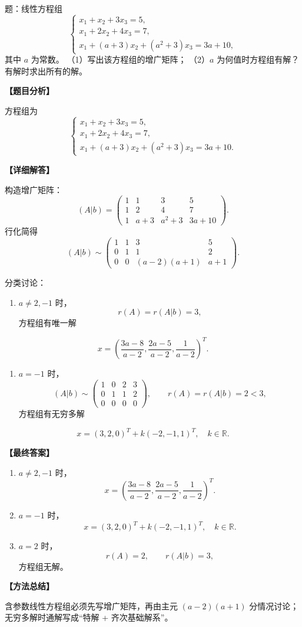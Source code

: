 ﻿\documentclass[11pt,a4paper,UTF8]{ctexart}
\begin{document}
\begin{answerbox}
题：线性方程组
\[
\begin{cases}
x_1+x_2+3x_3=5,\\
x_1+2x_2+4x_3=7,\\
x_1+(a+3)x_2+(a^2+3)x_3=3a+10,
\end{cases}
\]
其中 $a$ 为常数。
（1）写出该方程组的增广矩阵；
（2）$a$ 为何值时方程组有解？有解时求出所有的解。

\textbf{【题目分析】}

方程组为
\[
\begin{cases}
x_1+x_2+3x_3=5,\\
x_1+2x_2+4x_3=7,\\
x_1+(a+3)x_2+(a^2+3)x_3=3a+10.
\end{cases}
\]

\textbf{【详细解答】}

构造增广矩阵：
\[
(A|b)=
\begin{pmatrix}
1&1&3&5\\
1&2&4&7\\
1&a+3&a^2+3&3a+10
\end{pmatrix}.
\]
行化简得
\[
(A|b)\sim
\begin{pmatrix}
1&1&3&5\\
0&1&1&2\\
0&0&(a-2)(a+1)&a+1
\end{pmatrix}.
\]

分类讨论：
\begin{enumerate}
\item $a\ne2,-1$ 时，
\[
r(A)=r(A|b)=3,
\]
方程组有唯一解
\end{enumerate}
\[
x=\left(\frac{3a-8}{a-2},\frac{2a-5}{a-2},\frac1{a-2}\right)^T.
\]

\begin{enumerate}
\item $a=-1$ 时，
\[
(A|b)\sim
\begin{pmatrix}
1&0&2&3\\
0&1&1&2\\
0&0&0&0
\end{pmatrix},
\qquad r(A)=r(A|b)=2<3,
\]
方程组有无穷多解
\end{enumerate}
\[
x=(3,2,0)^T+k(-2,-1,1)^T,\quad k\in\mathbb R.
\]

\textbf{【最终答案】}

\begin{enumerate}
\item $a\ne2,-1$ 时，
\[
x=\left(\frac{3a-8}{a-2},\frac{2a-5}{a-2},\frac1{a-2}\right)^T.
\]
\item $a=-1$ 时，
\[
x=(3,2,0)^T+k(-2,-1,1)^T,\quad k\in\mathbb R.
\]
\item $a=2$ 时，
\[
r(A)=2,\qquad r(A|b)=3,
\]
方程组无解。
\end{enumerate}

\textbf{【方法总结】}

含参数线性方程组必须先写增广矩阵，再由主元 \((a-2)(a+1)\) 分情况讨论；无穷多解时通解写成“特解 + 齐次基础解系”。
\end{answerbox}
\end{document}
